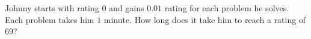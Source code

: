 Johnny starts with rating $0$ and gains $0.01$ rating for each problem he solves. Each problem takes him $1$ minute. How long does it take him to reach a rating of $69$?

